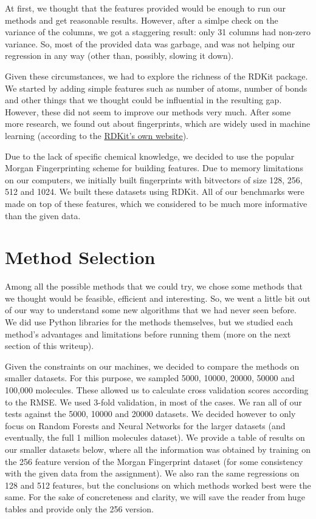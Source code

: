\documentclass[10pt]{article}
\begin{document}
At first, we thought that the features provided would be enough to run our
methods and get reasonable results. However, after a simlpe check on the variance
of the columns, we got a staggering result: only 31 columns
had non-zero variance. So, most of the provided data was garbage, and was
not helping our regression in any way (other than, possibly, slowing it down).

\medskip

Given these circumstances, we had to explore the richness of the RDKit package.
We started by adding simple features such as number of atoms, number of bonds
and other things that we thought could be influential in the resulting gap.
However, these did not seem to improve our methods very much. After some more
research, we found out about fingerprints, which are widely used in machine
learning (according to the \href{http://www.rdkit.org/docs/Cookbook.html}{RDKit's own website}).

\medskip

Due to the lack of specific chemical knowledge, we decided to use the popular
Morgan Fingerprinting scheme for building features. Due to memory limitations
on our computers, we initially built fingerprints with bitvectors of size
128, 256, 512 and 1024. We built these datasets using RDKit.
All of our benchmarks were made on top of these features, which we considered
to be much more informative than the given data. 

\section{Method Selection}

Among all the possible methods that we could try, we chose some methods that
we thought would be feasible, efficient and interesting. So, we went a little
bit out of our way to understand some new algorithms that we had never seen
before. We did use Python libraries for the methods themselves, but we studied
each method's advantages and limitations before running them (more on the next
section of this writeup).

\medskip

Given the constraints on our machines, we decided to compare the methods
on smaller datasets. For this purpose, we sampled 5000, 10000, 20000, 50000 and
100,000 molecules. These allowed us to calculate cross validation scores 
according to the RMSE. We used 3-fold validation, in most of the cases. We ran
all of our tests against the 5000, 10000 and 20000 datasets. We decided
however to only focus on Random Forests and Neural Networks for the larger
datasets (and eventually, the full 1 million molecules dataset). We provide
a table of results on our smaller datasets below, where all the information
was obtained by training on the 256 feature version of the Morgan Fingerprint dataset
(for some consistency with the given data from the assignment). We also ran the
same regressions on 128 and 512 features, but the conclusions on which methods
worked best were the same. For the sake of concreteness and clarity, we will
save the reader from huge tables and provide only the 256 version.
\end{document}
